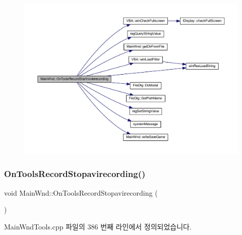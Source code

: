 \begin{figure}[H]
\begin{center}
\leavevmode
\includegraphics[width=350pt]{class_main_wnd_af473a4d7ccfadb980b92de352ea6a4ae_cgraph}
\end{center}
\end{figure}
\mbox{\label{class_main_wnd_a46eb975ae0f428195025c8c2a83fcabb}} 
\subsubsection{\texorpdfstring{On\+Tools\+Record\+Stopavirecording()}{OnToolsRecordStopavirecording()}}
{\footnotesize\ttfamily void Main\+Wnd\+::\+On\+Tools\+Record\+Stopavirecording (\begin{DoxyParamCaption}{ }\end{DoxyParamCaption})\hspace{0.3cm}{\ttfamily [protected]}}



Main\+Wnd\+Tools.\+cpp 파일의 386 번째 라인에서 정의되었습니다.


